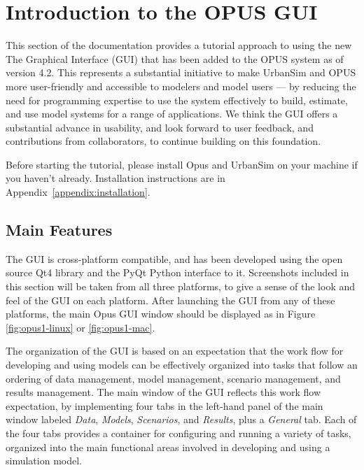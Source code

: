 \chapter{Introduction to the OPUS GUI}

This section of the documentation provides a tutorial approach to using the
new The Graphical Interface (GUI) that has been added to the OPUS system as
of version 4.2.  This represents a substantial initiative to make UrbanSim
and OPUS more user-friendly and accessible to modelers and model users ---
by reducing the need for programming expertise to use the system
effectively to build, estimate, and use model systems for a range of
applications.  We think the GUI offers a substantial advance in usability,
and look forward to user feedback, and contributions from collaborators, to
continue building on this foundation.

Before starting the tutorial, please install Opus and UrbanSim on your
machine if you haven't already.  Installation instructions are in
Appendix~\ref{appendix:installation}.

\section{Main Features}

The GUI is cross-platform compatible, and has been developed using the open
source Qt4 library and the PyQt Python interface to it.  Screenshots
included in this section will be taken from all three platforms, to give a
sense of the look and feel of the GUI on each platform.  After launching
the GUI from any of these platforms, the main Opus GUI window should be
displayed as in Figure \ref{fig:opus1-linux} or \ref{fig:opus1-mac}.

The organization of the GUI is based on an expectation that the work flow
for developing and using models can be effectively organized into tasks
that follow an ordering of data management, model management, scenario
management, and results management.  The main window of the GUI reflects
this work flow expectation, by implementing four tabs in the left-hand
panel of the main window labeled \emph{Data}, \emph{Models},
\emph{Scenarios}, and \emph{Results}, plus a \emph{General} tab.  Each of
the four tabs provides a container for configuring and running a variety of
tasks, organized into the main functional areas involved in developing and
using a simulation model.

